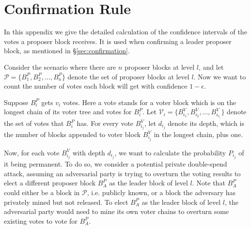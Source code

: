 \chapter{Confirmation Rule}
\label{apx:confirmation}

In this appendix we give the detailed calculation of the confidence intervals of the votes a proposer block receives. It is used when confirming a leader proposer block, as mentioned in \S\ref{sec:confirmation}.

Consider the scenario where there are $n$ proposer blocks at level $l$, and let $\mathcal P =\{B^P_1, B^P_2, \ldots, B^P_n\}$ denote the set of proposer blocks at level $l$. Now we want to count the number of votes each block will get with confidence $1-\epsilon$.

Suppose $B^P_i$ gets $v_i$ votes. Here a vote stands for a voter block which is on the longest chain of its voter tree and votes for $B^P_i$. 
Let $\mathcal V_i =\{B^V_{i_1}, B^V_{i_2}, \ldots, B^V_{i_{v_i}}\}$ denote the set of votes that $B^P_i$ has. For every vote $B^V_{i_j}$, let $d_{i_j}$ denote its depth, which is the number of blocks appended to voter block $B^V_{i_j}$ in the longest chain, plus one.

Now, for each vote $B^V_{i_j}$ with depth $d_{i_j}$, we want to calculate the probability $P_{i_j}$ of it being permanent. 
To do so, we consider a potential private double-spend attack, assuming an adversarial party is trying to overturn the voting results to elect a different proposer block $B^P_A$ as the leader block of level $l$. 
Note that $B^P_A$ could either be a block in $\mathcal P$, i.e. publicly known, or a block the adversary has privately mined but not released. 
To elect $B^P_A$ as the leader block of level $l$, the adversarial party would need to mine its own voter chains to overturn some existing votes to vote for $B^P_A$. 


